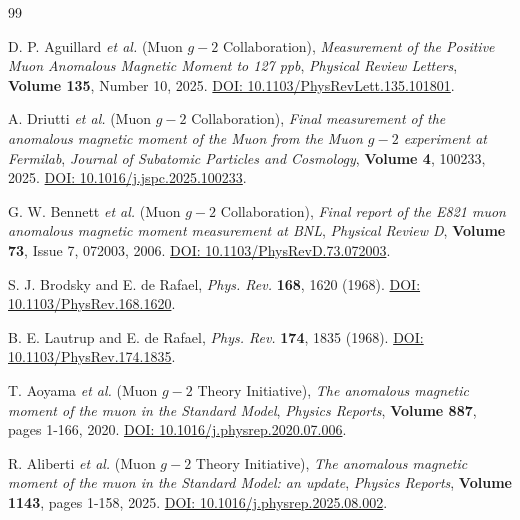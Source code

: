 \begin{thebibliography}{99}


    D. P. Aguillard \textit{et al.} (Muon \(g-2\) Collaboration),
    \emph{Measurement of the Positive Muon Anomalous Magnetic Moment to 127 ppb},
    \emph{Physical Review Letters}, \textbf{Volume 135}, Number 10, 2025.
    \href{https://doi.org/10.1103/PhysRevLett.135.101801}{DOI: 10.1103/PhysRevLett.135.101801}.

    A. Driutti \textit{et al.} (Muon \(g-2\) Collaboration),
    \emph{Final measurement of the anomalous magnetic moment of the Muon from the Muon \(g-2\) experiment at Fermilab},
    \emph{Journal of Subatomic Particles and Cosmology}, \textbf{Volume 4}, 100233, 2025.
    \href{https://doi.org/10.1016/j.jspc.2025.100233}{DOI: 10.1016/j.jspc.2025.100233}.

    G. W. Bennett \textit{et al.} (Muon \(g-2\) Collaboration),
    \emph{Final report of the E821 muon anomalous magnetic moment measurement at BNL},
    \emph{Physical Review D}, \textbf{Volume 73}, Issue 7, 072003, 2006.
    \href{https://doi.org/10.1103/PhysRevD.73.072003}{DOI: 10.1103/PhysRevD.73.072003}.

    S. J. Brodsky and E. de Rafael,
    \emph{Phys. Rev.} \textbf{168}, 1620 (1968).
    \href{https://doi.org/10.1103/PhysRev.168.1620}{DOI: 10.1103/PhysRev.168.1620}.

    B. E. Lautrup and E. de Rafael,
    \emph{Phys. Rev.} \textbf{174}, 1835 (1968).
    \href{https://doi.org/10.1103/PhysRev.174.1835}{DOI: 10.1103/PhysRev.174.1835}.

    T. Aoyama \textit{et al.} (Muon \(g-2\) Theory Initiative),
    \emph{The anomalous magnetic moment of the muon in the Standard Model},
    \emph{Physics Reports}, \textbf{Volume 887}, pages 1-166, 2020.
    \href{https://doi.org/10.1016/j.physrep.2020.07.006}{DOI: 10.1016/j.physrep.2020.07.006}.

    R. Aliberti \textit{et al.} (Muon \(g-2\) Theory Initiative),
    \emph{The anomalous magnetic moment of the muon in the Standard Model: an update},
    \emph{Physics Reports}, \textbf{Volume 1143}, pages 1-158, 2025.
    \href{https://doi.org/10.1016/j.physrep.2025.08.002}{DOI: 10.1016/j.physrep.2025.08.002}.



\end{thebibliography}

